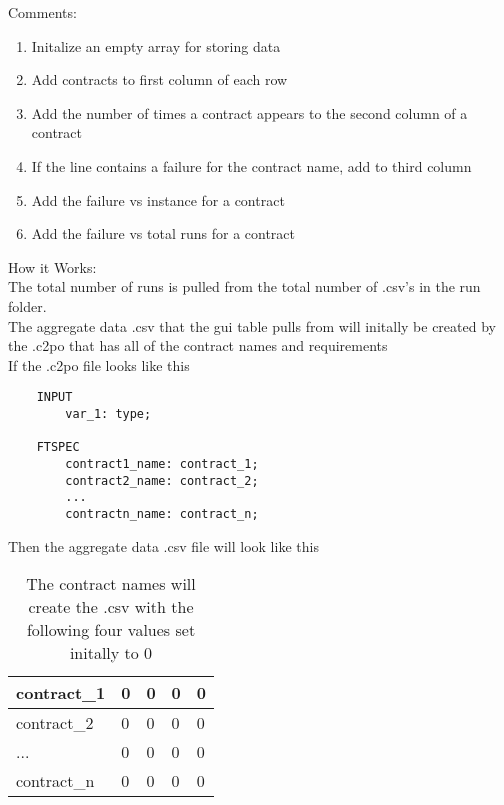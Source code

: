 \documentclass{article}
\begin{document}
    \newpage
    Comments:\\
    \begin{enumerate}
        \item Initalize an empty array for storing data
        \item Add contracts to first column of each row
        \item Add the number of times a contract appears to the second column of a contract
        \item If the line contains a failure for the contract name, add to third column
        \item Add the failure vs instance for a contract
        \item Add the failure vs total runs for a contract
    \end{enumerate}
    How it Works:\\
    The total number of runs is pulled from the total number of .csv's in the run folder.\\
    The aggregate data .csv that the gui table pulls from will initally be created by the .c2po that has all of the contract names and requirements\\
    If the .c2po file looks like this\\
    
    \begin{lstlisting}
    INPUT
        var_1: type;
    
    FTSPEC
        contract1_name: contract_1;
        contract2_name: contract_2;
        ...
        contractn_name: contract_n;
    \end{lstlisting}
    \vspace{1cm}
    Then the aggregate data .csv file will look like this\\

    \begin{table}[h!]
        \center
        \begin{tabular}{|l|l|l|l|l|}
            \hline
            contract\_1 & 0          & 0        & 0                   & 0                \\ \hline
            contract\_2 & 0          & 0        & 0                   & 0                \\ \hline
            ...         & 0          & 0        & 0                   & 0                \\ \hline
            contract\_n & 0          & 0        & 0                   & 0                \\ \hline
        \end{tabular}
        \caption{The contract names will create the .csv with the following four values set initally to 0}
        \label{table:1}
        \end{table}
\end{document}

